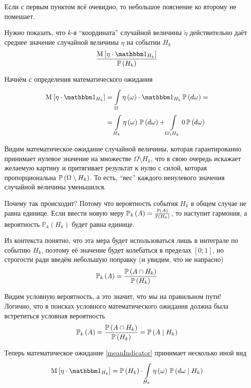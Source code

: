 Если с первым пунктом всё очевидно,
то небольшое пояснение ко второму не помешает.

Нужно показать, что $k$-я ``координата'' случайной величины $\tilde{\eta}$
действительно даёт среднее значение случайной величины $\eta$ на событии $H_k$
$$\frac{\Mean{ \eta \cdot \indicatorof{H_k} }}{\probability{H_k}}$$

Начнём с определения математического ожидания
\begin{equation}\label{meanIndicator}
    \begin{aligned}
    \Mean{ \eta \cdot \indicatorof{H_k} }
        &=\integrall{\Omega}{\probability{d\omega}}{
            \eta\left( \omega \right) \cdot \indicatorof{H_k}} =\\
        &=\integrall{H_k}{\probability{d\omega}}{\eta\left( \omega \right)}
            + \integrall{\Omega \setminus H_k}{
                \probability{d\omega}}{0}
    \end{aligned}
\end{equation}

Видим математическое ожидание случайной величины,
которая гарантированно принимает нулевое значение
на множестве $\Omega \setminus H_k$,
что в свою очередь искажает желаемую картину и притягивает результат к нулю
с силой, которая пропорциональна $\mathbb{P}\left( \Omega \setminus H_k \right)$.
То есть, ``вес'' каждого ненулевого значения случайной величины уменьшился.

Почему так происходит?
Потому что вероятность события $H_k$ в общем случае не равна единице.
Если ввести новую меру
$\mathbb{P}_k\left( A \right)=\frac{\mathbb{P}\left( A \right)}{\mathbb{P}\left( H_k \right)}$,
то наступит гармония, а
вероятность $\mathbb{P}_k\left( H_k \right)$ будет равна единице.

Из контекста понятно, что эта мера будет использоваться лишь в интеграле
по событию $H_k$,
поэтому её значение будет колебаться в пределах $\left[ 0;1 \right]$,
но строгости ради введём небольшую поправку (и увидим, что не напрасно)
$$\mathbb{P}_k\left( A \right)
    =\frac{\mathbb{P}\left( A\cap H_k \right)}{\mathbb{P}\left( H_k \right)}$$

Видим условную вероятность, а это значит, что мы на правильном пути!
Логично, что в поисках условного математического ожидания
должна была встретиться условная вероятность
$$\mathbb{P}_k\left( A \right)
    =\frac{\mathbb{P}\left( A\cap H_k \right)}{\mathbb{P}\left( H_k \right)}
    =\mathbb{P}\left( A \mid H_k \right)$$

Теперь математическое ожидание \eqref{meanIndicator}
принимает несколько иной вид
$$\Mean{ \eta \cdot \indicatorof{H_k} }
        = \probability{H_k}
            \cdot \integrall{H_k}{\probability{d\omega \mid H_k}}{
                \eta\left( \omega \right)}$$

